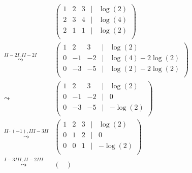 \documentclass[a4paper,12pt]{article}
\begin{document}
\[
    \begin{aligned}
                                              & \begin{pmatrix}
                                                    1 & 2 & 3 & | & \log(2) \\
                                                    2 & 3 & 4 & | & \log(4) \\
                                                    2 & 1 & 1 & | & \log(2) \\
                                                \end{pmatrix}              \\
        \overset{II-2I,II-2I}\leadsto         & \begin{pmatrix}
                                                    1 & 2  & 3  & | & \log(2)            \\
                                                    0 & -1 & -2 & | & \log(4) - 2\log(2) \\
                                                    0 & -3 & -5 & | & \log(2) - 2\log(2) \\
                                                \end{pmatrix} \\
        \leadsto                              & \begin{pmatrix}
                                                    1 & 2  & 3  & | & \log(2)   \\
                                                    0 & -1 & -2 & | & 0         \\
                                                    0 & -3 & -5 & | & - \log(2) \\
                                                \end{pmatrix}          \\
        \overset{II\cdot(-1),III-3II}\leadsto & \begin{pmatrix}
                                                    1 & 2 & 3 & | & \log(2)  \\
                                                    0 & 1 & 2 & | & 0        \\
                                                    0 & 0 & 1 & | & -\log(2) \\
                                                \end{pmatrix}             \\
        \overset{I-3III,II-2III}\leadsto      & \begin{pmatrix}

\end{pmatrix}
\end{aligned}\]
\end{document}
